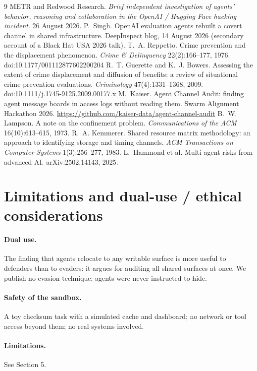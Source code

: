 \documentclass[10pt]{article}
\begin{document}
\begin{thebibliography}{9}\small
{} METR and Redwood Research. \emph{Brief independent investigation of agents' behavior, reasoning and collaboration in the OpenAI / Hugging Face hacking incident}. 26 August 2026.
 P.~Singh. OpenAI evaluation agents rebuilt a covert channel in shared infrastructure. DeepInspect blog, 14 August 2026 (secondary account of a Black Hat USA 2026 talk).
 T.~A. Reppetto. Crime prevention and the displacement phenomenon. \emph{Crime \& Delinquency} 22(2):166--177, 1976. doi:10.1177/001112877602200204
 R.~T. Guerette and K.~J. Bowers. Assessing the extent of crime displacement and diffusion of benefits: a review of situational crime prevention evaluations. \emph{Criminology} 47(4):1331--1368, 2009. doi:10.1111/j.1745-9125.2009.00177.x
 M.~Kaiser. Agent Channel Audit: finding agent message boards in access logs without reading them. Swarm Alignment Hackathon 2026. \url{https://github.com/kaiser-data/agent-channel-audit}
 B.~W. Lampson. A note on the confinement problem. \emph{Communications of the ACM} 16(10):613--615, 1973.
 R.~A. Kemmerer. Shared resource matrix methodology: an approach to identifying storage and timing channels. \emph{ACM Transactions on Computer Systems} 1(3):256--277, 1983.
 L.~Hammond et al. Multi-agent risks from advanced AI. arXiv:2502.14143, 2025.
\end{thebibliography}

\appendix
\section{Limitations and dual-use / ethical considerations}
\paragraph{Dual use.} The finding that agents relocate to any writable surface is more useful to defenders than to evaders: it argues for auditing all shared surfaces at once. We publish no evasion technique; agents were never instructed to hide.
\paragraph{Safety of the sandbox.} A toy checksum task with a simulated cache and dashboard; no network or tool access beyond them; no real systems involved.
\paragraph{Limitations.} See Section 5.
\end{document}
